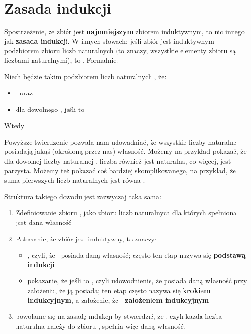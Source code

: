 \section{Zasada indukcji}

Spostrzeżenie, że zbiór  jest \textbf{najmniejszym} zbiorem induktywnym,  to nic innego jak \textbf{zasada indukcji}. W innych słowach: jeśli zbiór  jest induktywnym podzbiorem zbioru liczb naturalnych (to znaczy, wszystkie elementy zbioru  są liczbami naturalnymi), to . Formalnie:

\begin{theo}
Niech  będzie takim podzbiorem liczb naturalnych , że:
\begin{itemize}
    \item {}, oraz
    \item dla dowolnego , jeśli  to 
\end{itemize}
Wtedy 
\label{theo:induction-v1}
\end{theo}

Powyższe twierdzenie pozwala nam udowadniać, że wszystkie liczby naturalne posiadają jakąś (określoną przez nas) własność. Możemy na przykład pokazać, że dla dowolnej liczby naturalnej , liczba  również jest naturalna, co więcej, jest parzysta. Możemy też pokazać coś bardziej skomplikowanego, na przykład, że suma  pierwszych liczb naturalnych jest równa .

Struktura takiego dowodu jest zazwyczaj taka sama:
\begin{enumerate}
    \item Zdefiniowanie zbioru , jako zbioru liczb naturalnych  dla których spełniona jest dana własność
    \item Pokazanie, że zbiór  jest induktywny, to znaczy:
    \begin{itemize}
        \item {}, czyli, że~ posiada daną własność; często ten etap nazywa się \textbf{podstawą indukcji}
        \item pokazanie, że jeśli  to , czyli udowodnienie, że  posiada daną własność przy założeniu, że  ją posiada; ten etap często nazywa się \textbf{krokiem indukcyjnym}, a założenie, że  - \textbf{założeniem indukcyjnym}
    \end{itemize}
    \item powołanie się na zasadę indukcji by stwierdzić, że , czyli każda liczba naturalna należy do zbioru , spełnia więc daną własność.
\end{enumerate}

